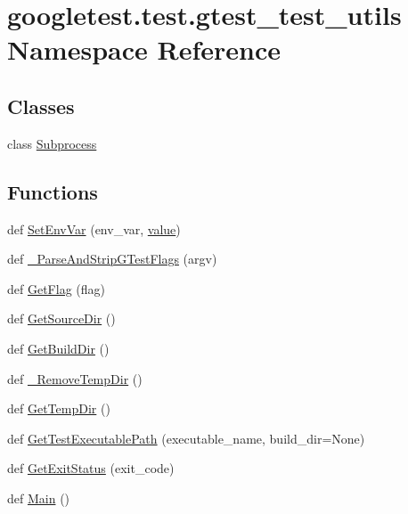 \hypertarget{namespacegoogletest_1_1test_1_1gtest__test__utils}{}\section{googletest.\+test.\+gtest\+\_\+test\+\_\+utils Namespace Reference}
\label{namespacegoogletest_1_1test_1_1gtest__test__utils}
\subsection*{Classes}
\begin{DoxyCompactItemize}
\item 
class \mbox{\hyperlink{classgoogletest_1_1test_1_1gtest__test__utils_1_1_subprocess}{Subprocess}}
\end{DoxyCompactItemize}
\subsection*{Functions}
\begin{DoxyCompactItemize}
\item 
def \mbox{\hyperlink{namespacegoogletest_1_1test_1_1gtest__test__utils_a8fcfee85e4aaa05daca8429e45b6d0ae}{Set\+Env\+Var}} (env\+\_\+var, \mbox{\hyperlink{_obj__test_2lib_2googletest-master_2googlemock_2test_2gmock-matchers__test_8cc_a337b8a670efc0b086ad3af163f3121b6}{value}})
\item 
def \mbox{\hyperlink{namespacegoogletest_1_1test_1_1gtest__test__utils_a505c67c1ae6642dcb17e3a98d7d32a6b}{\+\_\+\+Parse\+And\+Strip\+G\+Test\+Flags}} (argv)
\item 
def \mbox{\hyperlink{namespacegoogletest_1_1test_1_1gtest__test__utils_a5fbeb1d0ff8d238ae1717ea9b9fb8e36}{Get\+Flag}} (flag)
\item 
def \mbox{\hyperlink{namespacegoogletest_1_1test_1_1gtest__test__utils_a9d2108c1a5f53b18368ebfc1970b73da}{Get\+Source\+Dir}} ()
\item 
def \mbox{\hyperlink{namespacegoogletest_1_1test_1_1gtest__test__utils_aec35e0a6c12b1f177d51032518e23a97}{Get\+Build\+Dir}} ()
\item 
def \mbox{\hyperlink{namespacegoogletest_1_1test_1_1gtest__test__utils_ac1596c0bacd7d78ea69851ca34e69605}{\+\_\+\+Remove\+Temp\+Dir}} ()
\item 
def \mbox{\hyperlink{namespacegoogletest_1_1test_1_1gtest__test__utils_a9830a60f90d2203cf0f492993021e2ea}{Get\+Temp\+Dir}} ()
\item 
def \mbox{\hyperlink{namespacegoogletest_1_1test_1_1gtest__test__utils_ac9af888c702350aac56b154a6af34098}{Get\+Test\+Executable\+Path}} (executable\+\_\+name, build\+\_\+dir=None)
\item 
def \mbox{\hyperlink{namespacegoogletest_1_1test_1_1gtest__test__utils_a77ff78f9754a6c7238a7d53e5b7769dd}{Get\+Exit\+Status}} (exit\+\_\+code)
\item 
def \mbox{\hyperlink{namespacegoogletest_1_1test_1_1gtest__test__utils_a563b0985f0a2e8cbdff05aefd1cd2f66}{Main}} ()
\end{DoxyCompactItemize}
